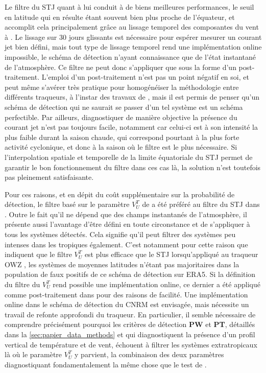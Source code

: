 \documentclass[../main.tex]{subfiles}
\begin{document}
Le filtre du STJ quant à lui conduit à de biens meilleures performances, le seuil en latitude qui en résulte étant souvent bien plus proche de l'équateur, et
accomplit cela principalement grâce au lissage temporel des composantes du vent à . Le lissage sur 30 jours glissants est nécessaire pour espérer
mesurer un courant jet bien défini, mais tout type de lissage temporel rend une implémentation online impossible, le schéma de détection n'ayant connaissance
que de l'état instantané de l'atmosphère. Ce filtre ne peut donc s'appliquer que sous la forme d'un post-traitement. L'emploi d'un post-traitement n'est pas un
point négatif en soi, et peut même s'avérer très pratique pour homogénéiser la méthodologie entre différents traqueurs, à l'instar des travaux de
\textcite{bourdin_intercomparison_2022}, mais il est permis de penser qu'un schéma de détection qui ne saurait se passer d'un tel système est un schéma
perfectible. Par ailleurs, diagnostiquer de manière objective la présence du courant jet n'est pas toujours facile, notamment car celui-ci est à son intensité
la plus faible durant la saison chaude, qui correspond pourtant à la plus forte activité cyclonique, et donc à la saison où le filtre est le plus nécessaire. Si
l'interpolation spatiale et temporelle de la limite équatoriale du STJ permet de garantir le bon fonctionnement du filtre dans ces cas là, la solution n'est
toutefois pas pleinement satisfaisante.

Pour ces raisons, et en dépit du coût supplémentaire sur la probabilité de détection, le filtre basé sur le paramètre $V_U^T$ de \textcite{hart_cyclone_2003} a
été préféré au filtre du STJ dans \textcite{dulac_assessing_2023}. Outre le fait qu'il ne dépend que des champs instantanés de l'atmosphère, il présente aussi
l'avantage d'être défini en toute circonstance et de s'appliquer à tous les systèmes détectés. Cela signifie qu'il peut filtrer des systèmes peu intenses dans
les tropiques également. C'est notamment pour cette raison que \textcite{bourdin_intercomparison_2022} indiquent que le filtre $V_U^T$ est plus efficace que le
STJ lorsqu'appliqué au traqueur OWZ \parencite{tory_importance_2013}, les systèmes de moyennes latitudes n'étant pas majoritaires dans la population de faux
positifs de ce schéma de détection sur ERA5. Si la définition du filtre du $V_U^T$ rend possible une implémentation online, ce dernier a été appliqué comme
post-traitement dans \textcite{dulac_assessing_2023} pour des raisons de facilité. Une implémentation online dans le schéma de détection du CNRM est envisagée,
mais nécessite un travail de refonte approfondi du traqueur. En particulier, il semble nécessaire de comprendre précisément pourquoi les critères de détection
\textbf{PW} et \textbf{PT}, détaillés dans la \cref{sec:papier_data_methods} et qui diagnostiquent la présence d'un profil vertical de température et de vent,
échouent à filtrer les systèmes extratropicaux là où le paramètre $V_U^T$ y parvient, la combinaison des deux paramètres diagnostiquant fondamentalement la même
chose que le test de \citeauthor{hart_cyclone_2003}.
\end{document}
